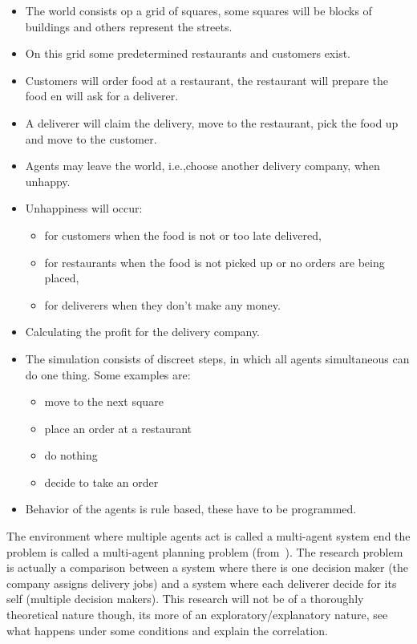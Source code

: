 \begin{itemize}
    \item   The world consists op a grid of squares, some squares will be blocks of buildings and others represent the streets.
    \item   On this grid some predetermined restaurants and customers exist.
    \item   Customers will order food at a restaurant, the restaurant will prepare the food en will ask for a deliverer.
    \item   A deliverer will claim the delivery, move to the restaurant, pick the food up and move to the customer.
    \item   Agents may leave the world, i.e.,choose another delivery company, when unhappy.
    \item   Unhappiness will occur:
    \begin{itemize}
        \item   for customers when the food is not or too late delivered,
        \item   for restaurants when the food is not picked up or no orders are being placed,
        \item   for deliverers when they don't make any money.
    \end{itemize}
    \item    Calculating the profit for the delivery company.
    \item    The simulation consists of discreet steps, in which all agents simultaneous can do one thing.
    Some examples are:
    \begin{itemize}
        \item  move to the next square
        \item  place an order at a restaurant
        \item  do nothing
        \item  decide to take an order
    \end{itemize}
    \item   Behavior of the agents is rule based, these have to be programmed.
\end{itemize}


The environment where multiple agents act is called a multi-agent system end the problem is called a multi-agent planning problem (from~\cite{russell2016artificial}).
The research problem is actually a comparison between a system where there is one decision maker (the company assigns delivery jobs) and a system where each deliverer decide for its self (multiple decision makers).
This research will not be of a thoroughly theoretical nature though, its more of an exploratory/explanatory nature, see what happens under some conditions and explain the correlation.

